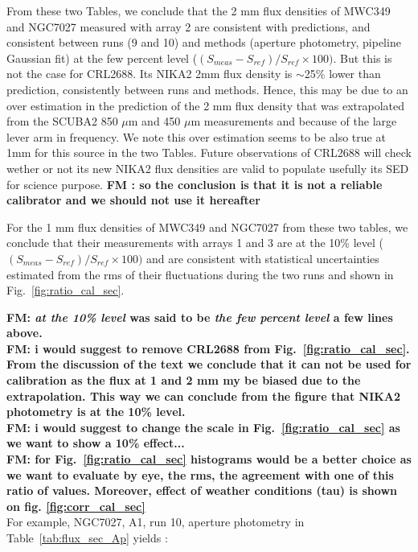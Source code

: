 From these two Tables, we conclude that  the 2 mm flux densities of MWC349 and NGC7027 measured with array 2 are consistent with predictions,
and consistent between runs (9 and 10) and methods (aperture photometry, pipeline Gaussian fit) at the few percent level
($(S_{meas}-S_{ref})/S_{ref} \times 100)$. But this is not the case for CRL2688.  Its NIKA2 2mm
flux density is $\sim$25\% lower than prediction, consistently between runs and methods. Hence, this may be due to an over estimation
in the prediction of the 2 mm flux density that was extrapolated from the SCUBA2 850 $\mu$m and 450 $\mu$m measurements
and because of the large lever arm in frequency. We note this
over estimation seems to be also true at 1mm for this source in the two Tables.
Future observations of CRL2688 will check wether or not its new NIKA2 flux densities are valid to populate usefully its SED
for science purpose. {\bf FM : so the conclusion is that it is not a reliable calibrator and we should not use it hereafter}

For the 1 mm flux densities of MWC349 and NGC7027 from these two tables, we conclude that their  measurements with arrays 1 and 3 are
at the 10\% level   ($(S_{meas}-S_{ref})/S_{ref} \times 100)$  and are consistent with statistical uncertainties estimated from
the rms of their fluctuations
during the two runs and shown in Fig.~\ref{fig:ratio_cal_sec}. 


{\bf FM: {\it at the 10\% level} was said to be {\it the few percent level} a few lines above.}\\

{\bf FM: i would suggest to remove CRL2688 from Fig.~\ref{fig:ratio_cal_sec}. From the discussion of the text we conclude that it can not be used for calibration as the
    flux at 1 and 2 mm my be biased due to the extrapolation. This way we can conclude from the figure that NIKA2 photometry is at the 10\%
    level.}\\
    
    {\bf FM: i would suggest to change the scale in Fig.~\ref{fig:ratio_cal_sec} as we want to show a 10\% effect...}\\
    
    {\bf FM: for Fig.~\ref{fig:ratio_cal_sec} histograms would be a better choice as we want to evaluate by eye, the rms, the agreement
    with one of this ratio of values. Moreover, effect of  weather conditions (tau) is shown on fig. \ref{fig:corr_cal_sec}}\\

For example, NGC7027, A1, run 10, aperture photometry in Table~\ref{tab:flux_sec_Ap}
yields  :

